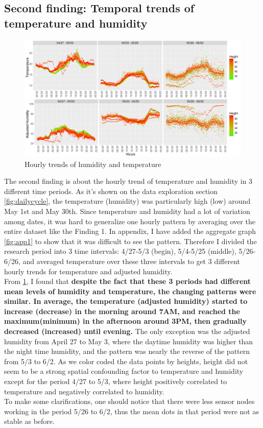 \documentclass[11pt]{article}
\begin{document}
{\subsection{Second finding: Temporal trends of temperature and humidity}
\begin{figure}[H]
\centering
\includegraphics [width=0.95\linewidth,height=0.5\linewidth]{find_2.png}
\caption{Hourly trends of humidity and temperature}
\label{fig:find2}
\end{figure}
The second finding is about the hourly trend of temperature and humidity in 3 different time periods. As it's shown on the data exploration section \ref{fig:dailycycle}, the temperature (humidity) was particularly high (low) around May 1st and May 30th. Since temperature and humidity had a lot of variation among dates, it was hard to generalize one hourly pattern by averaging over the entire dataset like the Finding 1. In appendix, I have added the aggregate graph \ref{fig:app1} to show that it was difficult to see the pattern. Therefore I divided the research period into 3 time intervals: 4/27-5/3 (begin), 5/4-5/25 (middle), 5/26-6/26, and averaged temperature over these three intervals to get 3 different hourly trends for temperature and adjusted humidity.\\
From \ref{fig:find2}, I found that \textbf{despite the fact that these 3 periods had different mean levels of humidity and temperature, the changing patterns were similar. In average, the temperature (adjusted humidity) started to increase (decrease) in the morning around 7AM, and reached the maximum(minimum) in the afternoon around 3PM, then gradually decreased (increased) until evening.} The only exception was the adjusted humidity from April 27 to May 3, where the daytime humidity was higher than the night time humidity, and the pattern was nearly the reverse of the pattern from 5/3 to 6/2. As we color coded the data points by heights, height did not seem to be a strong spatial confounding factor to temperature and humidity except for the period 4/27 to 5/3, where height positively correlated to temperature and negatively correlated to humidity.\\
To make some clarifications, one should notice that there were less sensor nodes working in the period 5/26 to 6/2, thus the mean dots in that period were not as stable as before.
}
\end{document}

